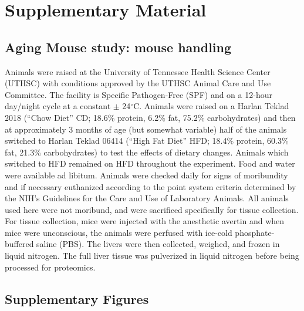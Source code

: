 \documentclass[num-refs]{wiley-article}
\newcommand{\beginsupplement}{%
	\setcounter{table}{0}
	\renewcommand{\thetable}{S\arabic{table}}%
	\setcounter{figure}{0}
	\renewcommand{\thefigure}{S\arabic{figure}}%
}
\begin{document}
\printendnotes




\newpage
\section{Supplementary Material}
\beginsupplement

\subsection{Aging Mouse study: mouse handling}
Animals were raised at the University of Tennessee Health Science Center (UTHSC) with conditions approved by the UTHSC Animal Care and Use Committee. The facility is Specific Pathogen-Free (SPF) and on a 12-hour day/night cycle at a constant $\pm$ 24$^{\circ}$C. Animals were raised on a Harlan Teklad 2018 (“Chow Diet” CD; 18.6\% protein, 6.2\% fat, 75.2\% carbohydrates) and then at approximately 3 months of age (but somewhat variable) half of the animals switched to Harlan Teklad 06414 (“High Fat Diet” HFD; 18.4\% protein, 60.3\% fat, 21.3\% carbohydrates) to test the effects of dietary changes. Animals which switched to HFD remained on HFD throughout the experiment. Food and water were available ad libitum. Animals were checked daily for signs of moribundity and if necessary euthanized according to the point system criteria determined by the NIH’s Guidelines for the Care and Use of Laboratory Animals. All animals used here were not moribund, and were sacrificed specifically for tissue collection. For tissue collection, mice were injected with the anesthetic avertin and when mice were unconscious, the animals were perfused with ice-cold phosphate-buffered saline (PBS). The livers were then collected, weighed, and frozen in liquid nitrogen. The full liver tissue was pulverized in liquid nitrogen before being processed for proteomics. 

\subsection{Supplementary Figures}
\end{document}
